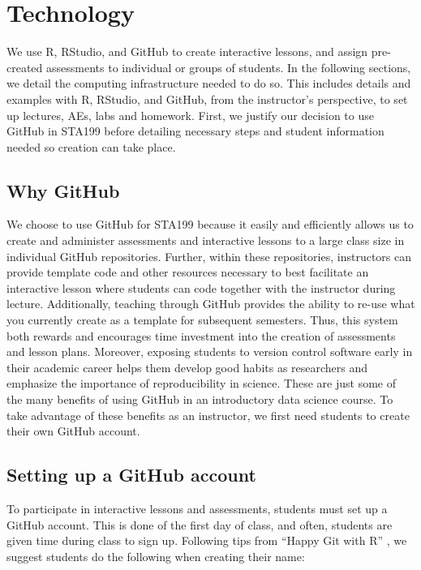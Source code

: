 \documentclass[
  12pt]{article}
\begin{document}
\hypertarget{sec-tech}{%
\section{Technology}\label{sec-tech}}

We use R, RStudio, and GitHub to create interactive lessons, and assign
pre-created assessments to individual or groups of students. In the
following sections, we detail the computing infrastructure needed to do
so. This includes details and examples with R, RStudio, and GitHub, from
the instructor's perspective, to set up lectures, AEs, labs and
homework. First, we justify our decision to use GitHub in STA199 before
detailing necessary steps and student information needed so creation can
take place.

\hypertarget{why-github}{%
\subsection{Why GitHub}\label{why-github}}

We choose to use GitHub for STA199 because it easily and efficiently
allows us to create and administer assessments and interactive lessons
to a large class size in individual GitHub repositories. Further, within
these repositories, instructors can provide template code and other
resources necessary to best facilitate an interactive lesson where
students can code together with the instructor during lecture.
Additionally, teaching through GitHub provides the ability to re-use
what you currently create as a template for subsequent semesters. Thus,
this system both rewards and encourages time investment into the
creation of assessments and lesson plans. Moreover, exposing students to
version control software early in their academic career helps them
develop good habits as researchers and emphasize the importance of
reproducibility in science. These are just some of the many benefits of
using GitHub in an introductory data science course. To take advantage
of these benefits as an instructor, we first need students to create
their own GitHub account.

\hypertarget{setting-up-a-github-account}{%
\subsection{Setting up a GitHub
account}\label{setting-up-a-github-account}}

To participate in interactive lessons and assessments, students must set
up a GitHub account. This is done of the first day of class, and often,
students are given time during class to sign up. Following tips from
``Happy Git with R'' \citep{bryan_hester_2020}, we suggest students do
the following when creating their name:
\end{document}
